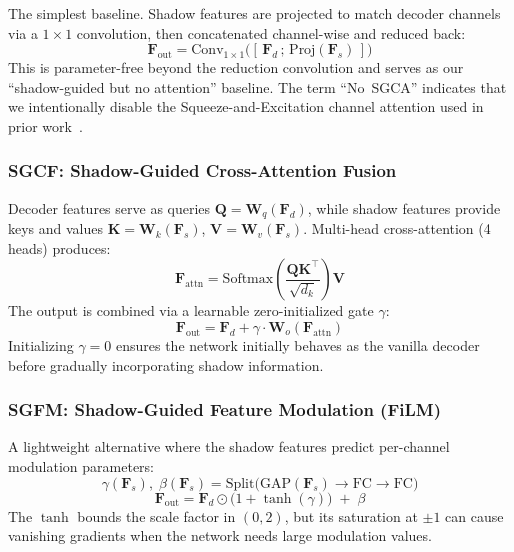 \documentclass[11pt]{article}
\begin{document}
The simplest baseline. Shadow features are projected to match decoder channels via a $1\times1$ convolution, then concatenated channel-wise and reduced back:
\begin{equation}
  \mathbf{F}_{\text{out}} = \text{Conv}_{1\times1}\big([\,\mathbf{F}_d \,;\, \text{Proj}(\mathbf{F}_s)\,]\big)
\end{equation}
This is parameter-free beyond the reduction convolution and serves as our ``shadow-guided but no attention'' baseline. The term ``No~SGCA'' indicates that we intentionally disable the Squeeze-and-Excitation channel attention used in prior work~\cite{li2023single}.

\subsubsection{SGCF: Shadow-Guided Cross-Attention Fusion}

Decoder features serve as queries $\mathbf{Q} = \mathbf{W}_q(\mathbf{F}_d)$, while shadow features provide keys and values $\mathbf{K} = \mathbf{W}_k(\mathbf{F}_s)$, $\mathbf{V} = \mathbf{W}_v(\mathbf{F}_s)$.
Multi-head cross-attention (4 heads) produces:
\begin{equation}
  \mathbf{F}_{\text{attn}} = \text{Softmax}\!\left(\frac{\mathbf{Q}\mathbf{K}^\top}{\sqrt{d_k}}\right)\mathbf{V}
\end{equation}
The output is combined via a learnable zero-initialized gate $\gamma$:
\begin{equation}
  \mathbf{F}_{\text{out}} = \mathbf{F}_d + \gamma \cdot \mathbf{W}_o(\mathbf{F}_{\text{attn}})
\end{equation}
Initializing $\gamma=0$ ensures the network initially behaves as the vanilla decoder before gradually incorporating shadow information.

\subsubsection{SGFM: Shadow-Guided Feature Modulation (FiLM)}

A lightweight alternative where the shadow features predict per-channel modulation parameters:
\begin{equation}
  \gamma(\mathbf{F}_s),\; \beta(\mathbf{F}_s) = \text{Split}\big(\text{GAP}(\mathbf{F}_s) \rightarrow \text{FC} \rightarrow \text{FC}\big)
\end{equation}
\begin{equation}
  \mathbf{F}_{\text{out}} = \mathbf{F}_d \odot \big(1 + \tanh(\gamma)\big) \;+\; \beta
\end{equation}
The $\tanh$ bounds the scale factor in $(0, 2)$, but its saturation at $\pm1$ can cause vanishing gradients when the network needs large modulation values.
\end{document}
